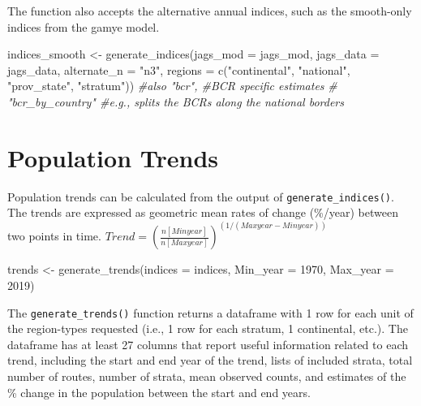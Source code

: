 \documentclass[
]{book}
\newenvironment{Shaded}{\begin{snugshade}}{\end{snugshade}}
\newcommand{\AttributeTok}[1]{\textcolor[rgb]{0.77,0.63,0.00}{#1}}
\newcommand{\CommentTok}[1]{\textcolor[rgb]{0.56,0.35,0.01}{\textit{#1}}}
\newcommand{\DecValTok}[1]{\textcolor[rgb]{0.00,0.00,0.81}{#1}}
\newcommand{\FunctionTok}[1]{\textcolor[rgb]{0.00,0.00,0.00}{#1}}
\newcommand{\NormalTok}[1]{#1}
\newcommand{\OtherTok}[1]{\textcolor[rgb]{0.56,0.35,0.01}{#1}}
\newcommand{\StringTok}[1]{\textcolor[rgb]{0.31,0.60,0.02}{#1}}
\begin{document}
The function also accepts the alternative annual indices, such as the smooth-only indices from the gamye model.

\begin{Shaded}
\begin{Highlighting}[]
\NormalTok{indices\_smooth }\OtherTok{\textless{}{-}} \FunctionTok{generate\_indices}\NormalTok{(}\AttributeTok{jags\_mod =}\NormalTok{ jags\_mod,}
                            \AttributeTok{jags\_data =}\NormalTok{ jags\_data,}
                            \AttributeTok{alternate\_n =} \StringTok{"n3"}\NormalTok{,}
                            \AttributeTok{regions =} \FunctionTok{c}\NormalTok{(}\StringTok{"continental"}\NormalTok{,}
                            \StringTok{"national"}\NormalTok{,}
                            \StringTok{"prov\_state"}\NormalTok{,}
                            \StringTok{"stratum"}\NormalTok{))}
                            \CommentTok{\#also "bcr", \#BCR specific estimates}
                            \CommentTok{\# "bcr\_by\_country" \#e.g., splits the BCRs along the national borders}
\end{Highlighting}
\end{Shaded}

\hypertarget{population-trends}{%
\section{Population Trends}\label{population-trends}}

Population trends can be calculated from the output of \texttt{generate\_indices()}. The trends are expressed as geometric mean rates of change (\%/year) between two points in time. \(Trend = (\frac {n[Minyear]}{n[Maxyear]})^{(1/(Maxyear-Minyear))}\)

\begin{Shaded}
\begin{Highlighting}[]
\NormalTok{trends }\OtherTok{\textless{}{-}} \FunctionTok{generate\_trends}\NormalTok{(}\AttributeTok{indices =}\NormalTok{ indices,}
                          \AttributeTok{Min\_year =} \DecValTok{1970}\NormalTok{,}
                          \AttributeTok{Max\_year =} \DecValTok{2019}\NormalTok{)}
\end{Highlighting}
\end{Shaded}

The \texttt{generate\_trends()} function returns a dataframe with 1 row for each unit of the region-types requested (i.e., 1 row for each stratum, 1 continental, etc.). The dataframe has at least 27 columns that report useful information related to each trend, including the start and end year of the trend, lists of included strata, total number of routes, number of strata, mean observed counts, and estimates of the \% change in the population between the start and end years.
\end{document}
